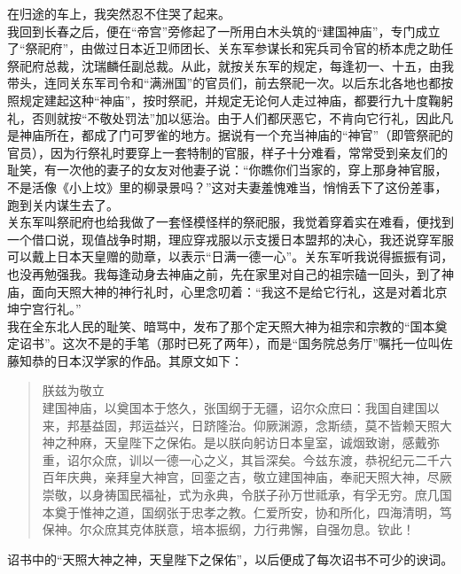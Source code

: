 在归途的车上，我突然忍不住哭了起来。\\

我回到长春之后，便在“帝宫”旁修起了一所用白木头筑的“建国神庙”，专门成立了“祭祀府”，由做过日本近卫师团长、关东军参谋长和宪兵司令官的桥本虎之助任祭祀府总裁，沈瑞麟任副总裁。从此，就按关东军的规定，每逢初一、十五，由我带头，连同关东军司令和“满洲国”的官员们，前去祭祀一次。以后东北各地也都按照规定建起这种“神庙”，按时祭祀，并规定无论何人走过神庙，都要行九十度鞠躬礼，否则就按“不敬处罚法”加以惩治。由于人们都厌恶它，不肯向它行礼，因此凡是神庙所在，都成了门可罗雀的地方。据说有一个充当神庙的“神官”（即管祭祀的官员），因为行祭礼时要穿上一套特制的官服，样子十分难看，常常受到亲友们的耻笑，有一次他的妻子的女友对他妻子说：“你瞧你们当家的，穿上那身神官服，不是活像《小上坟》里的柳录景吗？”这对夫妻羞愧难当，悄悄丢下了这份差事，跑到关内谋生去了。\\

关东军叫祭祀府也给我做了一套怪模怪样的祭祀服，我觉着穿着实在难看，便找到一个借口说，现值战争时期，理应穿戎服以示支援日本盟邦的决心，我还说穿军服可以戴上日本天皇赠的勋章，以表示“日满一德一心”。关东军听我说得振振有词，也没再勉强我。我每逢动身去神庙之前，先在家里对自己的祖宗磕一回头，到了神庙，面向天照大神的神行礼时，心里念叨着：“我这不是给它行礼，这是对着北京坤宁宫行礼。”\\

我在全东北人民的耻笑、暗骂中，发布了那个定天照大神为祖宗和宗教的“国本奠定诏书”。这次不是的手笔（那时已死了两年），而是“国务院总务厅”嘱托一位叫佐藤知恭的日本汉学家的作品。其原文如下：\\

\begin{quote}
	朕兹为敬立\\

建国神庙，以奠国本于悠久，张国纲于无疆，诏尔众庶曰：我国自建国以来，邦基益固，邦运益兴，日跻隆治。仰厥渊源，念斯绩，莫不皆赖天照大神之种麻，天皇陛下之保佑。是以朕向躬访日本皇室，诚烟致谢，感戴弥重，诏尔众庶，训以一德一心之义，其旨深矣。今兹东渡，恭祝纪元二千六百年庆典，亲拜皇大神宫，回銮之吉，敬立建国神庙，奉祀天照大神，尽厥崇敬，以身祷国民福祉，式为永典，令朕子孙万世祗承，有孚无穷。庶几国本奠于惟神之道，国纲张于忠孝之教。仁爱所安，协和所化，四海清明，笃保神。尔众庶其克体朕意，培本振纲，力行弗懈，自强勿息。钦此！\\
\end{quote}

诏书中的“天照大神之神，天皇陛下之保佑”，以后便成了每次诏书不可少的谀词。\\

